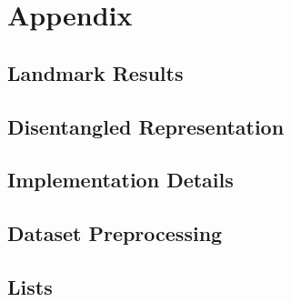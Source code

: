\documentclass[
	  paper    = a4,
	  BCOR     = 10mm,
	  twoside,
	  fontsize = 12pt,
	  fleqn,
	  toc      = bibnumbered,
	  toc      = listofnumbered,
	  numbers  = noendperiod,
	  headings = normal,
	  listof   = leveldown,
	  version  = 3.03
	]{scrreprt}
\begin{document}
	

	\tableofcontents
	\newpage
	
	
	
	
	
	
	
	

	\part{Appendix}
	\begin{appendix}
	\chapter{Landmark Results}
	
	\chapter{Disentangled Representation}
	
	\chapter{Implementation Details}
	
	\chapter{Dataset Preprocessing}
	
	\chapter{Lists}
	\listoffigures
	\listoftables
	{}
	
	
	\end{appendix}
	
\end{document}
